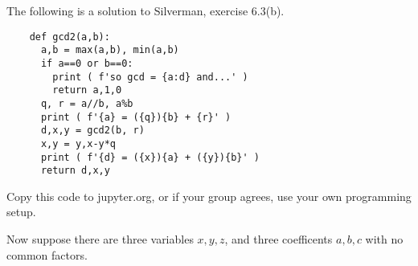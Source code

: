 \documentclass[12pt]{exam}
\begin{document}
\begin{questions}
  \question The following is a solution to Silverman, exercise 6.3(b).
  \begin{lstlisting}
    def gcd2(a,b):
      a,b = max(a,b), min(a,b)
      if a==0 or b==0:
        print ( f'so gcd = {a:d} and...' )
        return a,1,0
      q, r = a//b, a%b
      print ( f'{a} = ({q}){b} + {r}' )
      d,x,y = gcd2(b, r)
      x,y = y,x-y*q
      print ( f'{d} = ({x}){a} + ({y}){b}' )
      return d,x,y
  \end{lstlisting}
  Copy this code to jupyter.org, or if your group agrees, use your own programming setup.
  \newpage
  \question Now suppose there are three variables $x,y,z$, and three coefficents $a,b,c$ with no common factors.
\end{questions}
\end{document}
